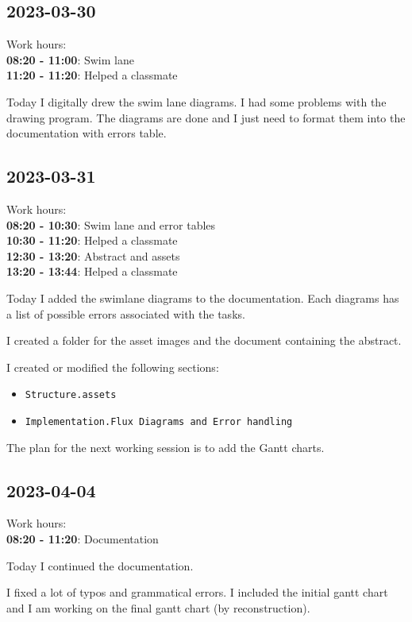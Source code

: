 \documentclass{article}
\begin{document}
\subsection{2023-03-30}

Work hours:\\
\textbf{08:20 - 11:00}: Swim lane \\
\textbf{11:20 - 11:20}: Helped a classmate

Today I digitally drew the swim lane diagrams.
I had some problems with the drawing program.
The diagrams are done and I just need to format them
into the documentation with errors table.

\subsection{2023-03-31}

Work hours:\\
\textbf{08:20 - 10:30}: Swim lane and error tables \\
\textbf{10:30 - 11:20}: Helped a classmate \\
\textbf{12:30 - 13:20}: Abstract and assets \\
\textbf{13:20 - 13:44}: Helped a classmate

Today I added the swimlane diagrams to the documentation.
Each diagrams has a list of possible errors associated
with the tasks.

I created a folder for the asset images and the
document containing the abstract.

I created or modified the following sections:
\begin{itemize}
    \item \texttt{Structure.assets}
    \item \texttt{Implementation.Flux Diagrams and Error handling}
\end{itemize}

The plan for the next working session is to add
the Gantt charts.

\subsection{2023-04-04}

Work hours: \\
\textbf{08:20 - 11:20}: Documentation

Today I continued the documentation.

I fixed a lot of typos and grammatical errors.
I included the initial gantt chart and I am working
on the final gantt chart (by reconstruction).
\end{document}
